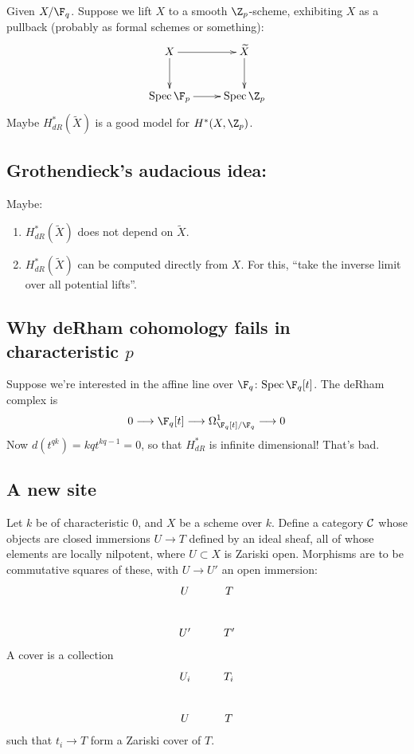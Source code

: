 \documentclass[11pt]{article}
\begin{document}
\begin{SaulCrystallineCohomology}
Given $X/\F_q$. Suppose we lift $X$ to a smooth $\Z_p$-scheme, exhibiting $X$ as a pullback (probably as formal schemes or something):
\[\xymatrix{
 X\ar[r]\ar[d]& \widetilde{X}\ar[d]\\
 \ar[r]\spec\F_p& \spec\Z_p
}\]
Maybe $H^*_{dR}(\widetilde{X})$ is a good model for $H^*(X,\Z_p)$.
\subsection*{Grothendieck's audacious idea:}
Maybe:
\begin{enumerate}\squishlist
\item $H^*_{dR}(\widetilde{X})$ does not depend on $\widetilde{X}$.
\item $H^*_{dR}(\widetilde{X})$ can be computed directly from $X$. For this, ``take the inverse limit over all potential lifts''.
\end{enumerate}
\subsection*{Why deRham cohomology fails in characteristic $p$}
Suppose we're interested in the affine line over $\F_q$: $\spec\F_q[t]$. The deRham complex is
\[0\to\F_q[t]\to\Omega^1_{\F_q[t]/\F_q}\to0\]
Now $d(t^{qk})=kqt^{kq-1}=0$, so that $H^*_{dR}$ is infinite dimensional! That's bad.
\subsection*{A new site}
Let $k$ be of characteristic $0$, and $X$ be a scheme over $k$. Define a category $\mathcal{C}$ whose objects are closed immersions $U\to T$ defined by an ideal sheaf, all of whose elements are locally nilpotent, where $U\subset X$ is Zariski open. Morphisms are to be commutative squares of these, with $U\to U'$ an open immersion:
\[\xymatrix{
 U& T\\
 U'& T'\\
}\]
A cover is a collection
\[\xymatrix{
 U_i& T_i\\
 U& T
}\]
such that $t_i\to T$ form a Zariski cover of $T$.


\end{SaulCrystallineCohomology}
\end{document}
